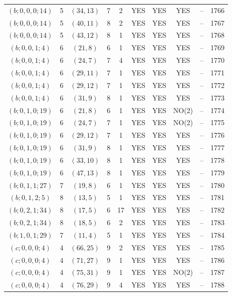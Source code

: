 \begin{longtable}{|c|c|c|c|c|c|c|c|c|c|}
$(b; 0, 0, 0; 14)$ & 5 & $(34, 13)$ & 7 & 2 & YES & YES & YES & -- & 1766\\
$(b; 0, 0, 0; 14)$ & 5 & $(40, 11)$ & 8 & 2 & YES & YES & YES & -- & 1767\\
$(b; 0, 0, 0; 14)$ & 5 & $(43, 12)$ & 8 & 1 & YES & YES & YES & -- & 1768\\
$(b; 0, 0, 1; 4)$ & 6 & $(21, 8)$ & 6 & 1 & YES & YES & YES & -- & 1769\\
$(b; 0, 0, 1; 4)$ & 6 & $(24, 7)$ & 7 & 4 & YES & YES & YES & -- & 1770\\
$(b; 0, 0, 1; 4)$ & 6 & $(29, 11)$ & 7 & 1 & YES & YES & YES & -- & 1771\\
$(b; 0, 0, 1; 4)$ & 6 & $(29, 12)$ & 7 & 1 & YES & YES & YES & -- & 1772\\
$(b; 0, 0, 1; 4)$ & 6 & $(31, 9)$ & 8 & 1 & YES & YES & YES & -- & 1773\\
$(b; 0, 1, 0; 19)$ & 6 & $(21, 8)$ & 6 & 1 & YES & YES & NO(2) & -- & 1774\\
$(b; 0, 1, 0; 19)$ & 6 & $(24, 7)$ & 7 & 1 & YES & YES & NO(2) & -- & 1775\\
$(b; 0, 1, 0; 19)$ & 6 & $(29, 12)$ & 7 & 1 & YES & YES & YES & -- & 1776\\
$(b; 0, 1, 0; 19)$ & 6 & $(31, 9)$ & 8 & 1 & YES & YES & YES & -- & 1777\\
$(b; 0, 1, 0; 19)$ & 6 & $(33, 10)$ & 8 & 1 & YES & YES & YES & -- & 1778\\
$(b; 0, 1, 0; 19)$ & 6 & $(47, 13)$ & 8 & 1 & YES & YES & YES & -- & 1779\\
$(b; 0, 1, 1; 27)$ & 7 & $(19, 8)$ & 6 & 1 & YES & YES & YES & -- & 1780\\
$(b; 0, 1, 2; 5)$ & 8 & $(13, 5)$ & 5 & 1 & YES & YES & YES & -- & 1781\\
$(b; 0, 2, 1; 34)$ & 8 & $(17, 5)$ & 6 & 17 & YES & YES & YES & -- & 1782\\
$(b; 0, 2, 1; 34)$ & 8 & $(18, 5)$ & 6 & 2 & YES & YES & YES & -- & 1783\\
$(b; 1, 0, 1; 29)$ & 7 & $(11, 4)$ & 5 & 1 & YES & YES & YES & -- & 1784\\
$(c; 0, 0, 0; 4)$ & 4 & $(66, 25)$ & 9 & 2 & YES & YES & YES & -- & 1785\\
$(c; 0, 0, 0; 4)$ & 4 & $(71, 27)$ & 9 & 1 & YES & YES & YES & -- & 1786\\
$(c; 0, 0, 0; 4)$ & 4 & $(75, 31)$ & 9 & 1 & YES & YES & NO(2) & -- & 1787\\
$(c; 0, 0, 0; 4)$ & 4 & $(76, 29)$ & 9 & 4 & YES & YES & YES & -- & 1788\\

\end{longtable}
